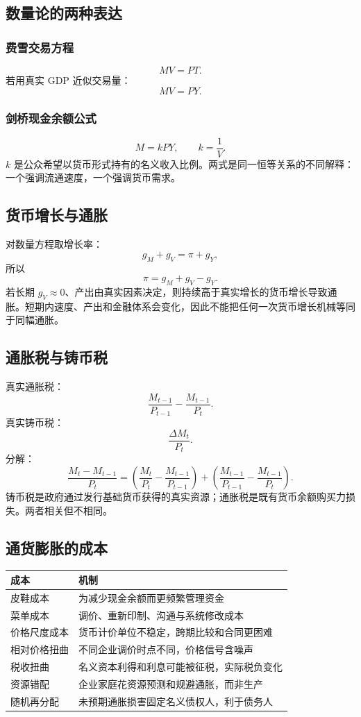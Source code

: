 \documentclass[UTF8,11pt,a4paper]{ctexart}
\begin{document}
\subsection{数量论的两种表达}
\subsubsection{费雪交易方程}
\[
MV=PT.
\]
若用真实 GDP 近似交易量：
\[
MV=PY.
\]
\subsubsection{剑桥现金余额公式}
\[
M=kPY,
\qquad k=\frac1V.
\]
$k$ 是公众希望以货币形式持有的名义收入比例。两式是同一恒等关系的不同解释：一个强调流通速度，一个强调货币需求。

\subsection{货币增长与通胀}
对数量方程取增长率：
\[
g_M+g_V=\pi+g_Y,
\]
所以
\[
\pi=g_M+g_V-g_Y.
\]
若长期 $g_V\approx0$、产出由真实因素决定，则持续高于真实增长的货币增长导致通胀。短期内速度、产出和金融体系会变化，因此不能把任何一次货币增长机械等同于同幅通胀。

\subsection{通胀税与铸币税}
真实通胀税：
\[
\frac{M_{t-1}}{P_{t-1}}-\frac{M_{t-1}}{P_t}.
\]
真实铸币税：
\[
\frac{\Delta M_t}{P_t}.
\]
分解：
\[
\frac{M_t-M_{t-1}}{P_t}
=\left(\frac{M_t}{P_t}-\frac{M_{t-1}}{P_{t-1}}\right)
+\left(\frac{M_{t-1}}{P_{t-1}}-\frac{M_{t-1}}{P_t}\right).
\]
铸币税是政府通过发行基础货币获得的真实资源；通胀税是既有货币余额购买力损失。两者相关但不相同。

\subsection{通货膨胀的成本}
\begin{longtable}{p{}p{}}
\toprule
成本 & 机制\\
\midrule
皮鞋成本 & 为减少现金余额而更频繁管理资金\\
菜单成本 & 调价、重新印制、沟通与系统修改成本\\
价格尺度成本 & 货币计价单位不稳定，跨期比较和合同更困难\\
相对价格扭曲 & 不同企业调价时点不同，价格信号含噪声\\
税收扭曲 & 名义资本利得和利息可能被征税，实际税负变化\\
资源错配 & 企业家庭花资源预测和规避通胀，而非生产\\
随机再分配 & 未预期通胀损害固定名义债权人，利于债务人\\
\bottomrule
\end{longtable}
\end{document}
